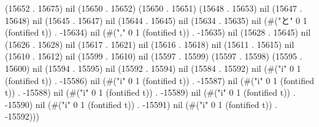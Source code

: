 (15652 . 15675) nil (15650 . 15652) (15650 . 15651) (15648 . 15653) nil (15647 . 15648) nil (15645 . 15647) nil (15644 . 15645) nil (15634 . 15635) nil (#("と" 0 1 (fontified t)) . -15634) nil (#("," 0 1 (fontified t)) . -15635) nil (15628 . 15645) nil (15626 . 15628) nil (15617 . 15621) nil (15616 . 15618) nil (15611 . 15615) nil (15610 . 15612) nil (15599 . 15610) nil (15597 . 15599) (15597 . 15598) (15595 . 15600) nil (15594 . 15595) nil (15592 . 15594) nil (15584 . 15592) nil (#("i" 0 1 (fontified t)) . -15586) nil (#("i" 0 1 (fontified t)) . -15587) nil (#("i" 0 1 (fontified t)) . -15588) nil (#("i" 0 1 (fontified t)) . -15589) nil (#("i" 0 1 (fontified t)) . -15590) nil (#("i" 0 1 (fontified t)) . -15591) nil (#("i" 0 1 (fontified t)) . -15592)))
